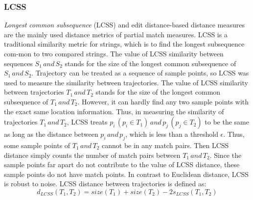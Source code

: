 \documentclass[a4paper, 12pt]{article}
\begin{document}
\subsubsection{LCSS}
\textit{Longest common subsequence} (LCSS) and edit distance-based distance measures are the mainly used distance metrics of partial match measures. LCSS is a traditional similarity metric for strings, which is to find the longest subsequence com-mon to two compared strings. The value of LCSS similarity between sequences $S_{1}\,and\,S_{2}$ stands for the size of the longest common subsequence of $S_{1}\,and\,S_{2}$. Trajectory can be treated as a sequence of sample points, so LCSS was used to measure the similarity between trajectories. The value of LCSS similarity between trajectories $T_{1}\,and\,T_{2}$ stands for the size of the longest common subsequence of $T_{1}\,and\,T_{2}$. However, it can hardly find any two sample points with the exact same location information. Thus, in measuring the similarity of trajectories $T_{1}\,and\,T_{2}$, LCSS treats $p_{i}\,(p_{i} \in T_{1})\,and\,p_{j}\,(p_{j} \in T_{2})$ to be the same as long as the distance between $p_{i}\,and\,p_{j}$, which is less than a threshold $\epsilon$. Thus, some sample points of $T_{1}\,and\,T_{2}$ cannot be in any match pairs. Then LCSS distance simply counts the number of match pairs between $T_{1}\,and\,T_{2}$. Since the sample points far apart do not contribute to the value of LCSS distance, these sample points do not have match points. In contrast to Euclidean distance, LCSS is robust to noise. LCSS distance between trajectories is defined as:
\begin{equation} \label{eq3}
    d_{LCSS}(T_{1}, T_{2}) = size(T_{1}) + size(T_{2}) - 2s_{LCSS}(T_{1},T_{2})
\end{equation}
\end{document}

